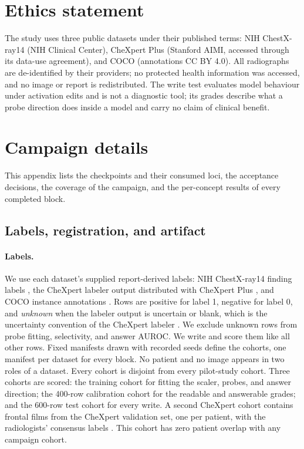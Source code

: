 \documentclass{article}
\begin{document}
\section*{Ethics statement}
The study uses three public datasets under their published terms: NIH ChestX-ray14 (NIH Clinical Center), CheXpert Plus (Stanford AIMI, accessed through its data-use agreement), and COCO (annotations CC BY 4.0). All radiographs are de-identified by their providers; no protected health information was accessed, and no image or report is redistributed. The write test evaluates model behaviour under activation edits and is not a diagnostic tool; its grades describe what a probe direction does inside a model and carry no claim of clinical benefit.



\clearpage
\appendix
\section{Campaign details}
\label{app:campaign}

This appendix lists the checkpoints and their consumed loci, the acceptance decisions, the coverage of the campaign, and the per-concept results of every completed block.

\subsection{Labels, registration, and artifact}
\label{app:cf-labels}

\paragraph{Labels.} We use each dataset's supplied report-derived labels: NIH ChestX-ray14 finding labels \citep{wang2017chestxray}, the CheXpert labeler output \citep{irvin2019chexpert} distributed with CheXpert Plus \citep{chambon2024chexpertplus}, and COCO instance annotations \citep{lin2014coco}. Rows are positive for label 1, negative for label 0, and \emph{unknown} when the labeler output is uncertain or blank, which is the uncertainty convention of the CheXpert labeler \citep{irvin2019chexpert}. We exclude unknown rows from probe fitting, selectivity, and answer AUROC. We write and score them like all other rows. Fixed manifests drawn with recorded seeds define the cohorts, one manifest per dataset for every block. No patient and no image appears in two roles of a dataset. Every cohort is disjoint from every pilot-study cohort. Three cohorts are scored: the training cohort for fitting the scaler, probes, and answer direction; the 400-row calibration cohort for the readable and answerable grades; and the 600-row test cohort for every write. A second CheXpert cohort contains \cfValidRows{} frontal films from the CheXpert validation set, one per patient, with the radiologists' consensus labels \citep{irvin2019chexpert}. This cohort has zero patient overlap with any campaign cohort.
\end{document}
